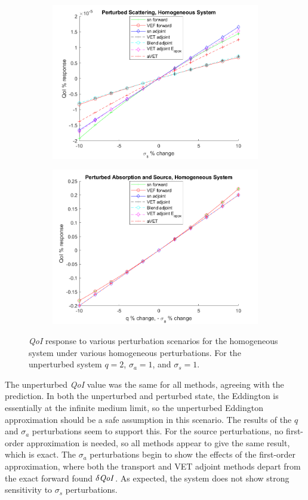 \documentclass[12pt]{report}
\newcommand{\sigs}{\sigma_s}
\newcommand{\siga}{\sigma_a}
\newcommand{\qoi}{{\it QoI}\xspace}
\begin{document}
\begin{figure}[H]
\begin{subfigure}{.5\textwidth}
  \includegraphics[width=.98\linewidth]{figures2/22sigsSens.png}
\end{subfigure}%
\begin{subfigure}{.5\textwidth}
  \centering
  \includegraphics[width=.98\linewidth]{figures2/22qsigaSens.png}
\end{subfigure}
\caption{\qoi response to various perturbation scenarios for the homogeneous system under various homogeneous perturbations. For the unperturbed system $q=2$, $\siga=1$, and $\sigs=1$.}
\label{fig:Trial1}
\end{figure}

The unperturbed \qoi value was the same for all methods, agreeing with the prediction. In both the unperturbed and perturbed state, the Eddington is essentially at the infinite medium limit, so the unperturbed Eddington approximation should be a safe assumption in this scenario. The results of the $q$ and $\siga$ perturbations seem to support this. For the source perturbations, no first-order approximation is needed, so all methods appear to give the same result, which is exact. The $\siga$ perturbations begin to show the effects of the first-order approximation, where both the transport and VET adjoint methods depart from the exact forward found $\delta \qoi$. As expected, the system does not show strong sensitivity to $\sigs$ perturbations.
\end{document}
